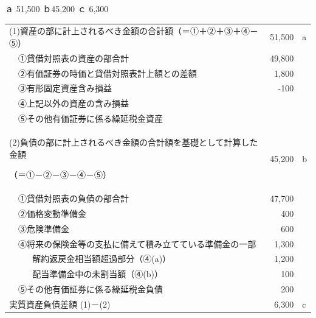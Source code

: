 \documentclass[report,gutter=10mm,fore-edge=10mm,uplatex,dvipdfmx]{jlreq}
\begin{document}
\answer{}

ａ 51,500
ｂ45,200
ｃ 6,300\\
\begin{tabular}{|l|l|l|r|l}
\cline{1-4}
\multicolumn{3}{|l|}{
(1)資産の部に計上されるべき金額の合計額（＝①＋②＋③＋④－⑤）} & 51,500 & a\\ \cline{2-4}
& \multicolumn{2}{l|}{①貸借対照表の資産の部合計} & 49,800 &\\ \cline{2-4}
& \multicolumn{2}{l|}{②有価証券の時価と貸借対照表計上額との差額} & 1,800 &\\ \cline{2-4}
& \multicolumn{2}{l|}{③有形固定資産含み損益} & -100 &\\ \cline{2-4}
& \multicolumn{2}{l|}{④上記以外の資産の含み損益} & &\\ \cline{2-4}
& \multicolumn{2}{l|}{⑤その他有価証券に係る繰延税金資産} & &\\ \cline{1-4}
\multicolumn{3}{|l|}{(2)負債の部に計上されるべき金額の合計額を基礎として計算した金額\par 
（＝①－②－③－④－⑤）} & 45,200& b\\ \cline{2-4}
& \multicolumn{2}{l|}{①貸借対照表の負債の部合計} & 47,700 &\\ \cline{2-4}
& \multicolumn{2}{l|}{②価格変動準備金} & 400 &\\ \cline{2-4}
& \multicolumn{2}{l|}{③危険準備金} & 600 &\\ \cline{2-4}
& \multicolumn{2}{l|}{④将来の保険金等の支払に備えて積み立てている準備金の一部} & 1,300 &\\ \cline{3-4}
&& 解約返戻金相当額超過部分（④(a)）& 1,200 &\\ \cline{3-4}
&& 配当準備金中の未割当額（④(b)）& 100 &\\ \cline{2-4}
& \multicolumn{2}{l|}{⑤その他有価証券に係る繰延税金負債} & 200 &\\ \cline{1-4}
\multicolumn{3}{|l|}{実質資産負債差額 (1)－(2)} & 6,300 & c\\ \cline{1-4}
\end{tabular}\\ \\ \\
\end{document}
